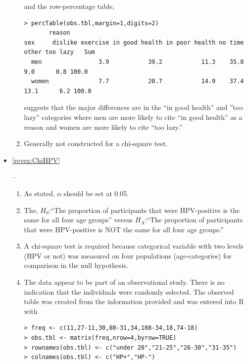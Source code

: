 \documentclass[10pt,openany]{book}\usepackage[]{graphicx}\usepackage[]{color}
\makeatletter
\newenvironment{kframe}{%
 \def\at@end@of@kframe{}%
 \ifinner\ifhmode%
  \def\at@end@of@kframe{\end{minipage}}%
  \begin{minipage}{\columnwidth}%
 \fi\fi%
 \def\FrameCommand##1{\hskip\@totalleftmargin \hskip-\fboxsep
 \colorbox{shadecolor}{##1}\hskip-\fboxsep
     \hskip-\linewidth \hskip-\@totalleftmargin \hskip\columnwidth}%
 \MakeFramed {\advance\hsize-\width
   \@totalleftmargin\z@ \linewidth\hsize
   \@setminipage}}%
 {\par\unskip\endMakeFramed%
 \at@end@of@kframe}
\newenvironment{knitrout}{}{} %
\makeatother
\begin{document}
\begin{itemize}
\begin{enumerate}
\begin{knitrout}
\end{knitrout}
and the row-percentage table,
\begin{knitrout}
\color{fgcolor}\begin{kframe}
\begin{verbatim}
> percTable(obs.tbl,margin=1,digits=2)
       reason
sex     dislike exercise in good health in poor health no time other too lazy   Sum
  men                3.9           39.2           11.3    35.8   9.0      0.8 100.0
  women              7.7           20.7           14.9    37.4  13.1      6.2 100.0
\end{verbatim}
\end{kframe}
\end{knitrout}
suggests that the major differences are in the ``in good health'' and ''too lazy'' categories where men are more likely to cite ``in good health'' as a reason and women are more likely to cite ``too lazy.''
      \item Generally not constructed for a chi-square test.
    \end{enumerate}
  \item \hypertarget{ans:ChiHPV}{\ref{revex:ChiHPV}} --
    \begin{enumerate}
      \item As stated, $\alpha$ should be set at 0.05.
      \item The, $H_{0}$:``The proportion of participants that were HPV-positive is the same for all four age groups'' versus $H_{A}$:``The proportion of participants that were HPV-positive is NOT the same for all four age groups.''
      \item A chi-square test is required because categorical variable with two levels (HPV or not) was measured on four populations (age-categories) for comparison in the null hypothesis.
      \item The data appear to be part of an observational study.  There is no indication that the individuals were randomly selected.  The observed table was created from the information provided and was entered into R with
\begin{knitrout}
\color{fgcolor}\begin{kframe}
\begin{verbatim}
> freq <- c(11,27-11,30,80-31,34,108-34,18,74-18)
> obs.tbl <- matrix(freq,nrow=4,byrow=TRUE)
> rownames(obs.tbl) <- c("under 20","21-25","26-30","31-35")
> colnames(obs.tbl) <- c("HP+","HP-")

\end{verbatim}
\end{kframe}
\end{knitrout}
\end{enumerate}
\end{itemize}
\end{document}
